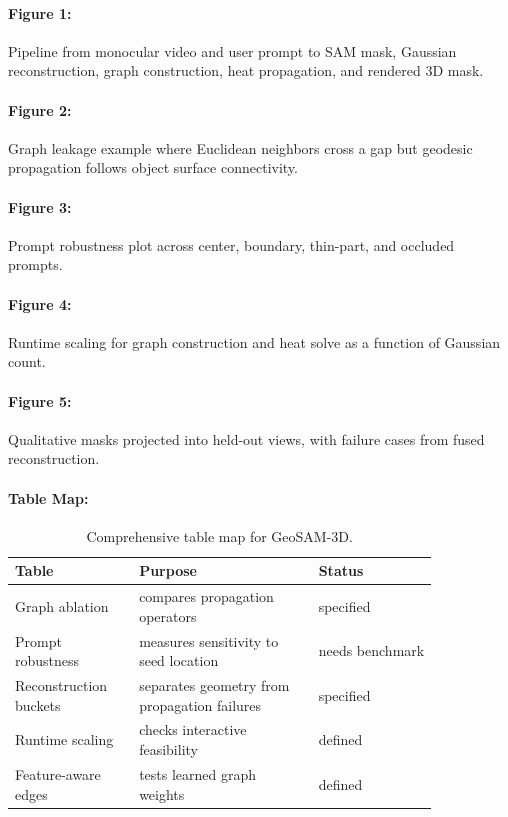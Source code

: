 \documentclass{article}
\begin{document}
\paragraph{Figure 1:}
Pipeline from monocular video and user prompt to SAM mask, Gaussian reconstruction, graph construction, heat propagation, and rendered 3D mask.

\paragraph{Figure 2:}
Graph leakage example where Euclidean neighbors cross a gap but geodesic propagation follows object surface connectivity.

\paragraph{Figure 3:}
Prompt robustness plot across center, boundary, thin-part, and occluded prompts.

\paragraph{Figure 4:}
Runtime scaling for graph construction and heat solve as a function of Gaussian count.

\paragraph{Figure 5:}
Qualitative masks projected into held-out views, with failure cases from fused reconstruction.

\paragraph{Table Map:}

\begin{table}[t]
\centering
\caption{Comprehensive table map for GeoSAM-3D.}
\begin{tabular}{@{}p{0.24\linewidth}p{0.36\linewidth}p{0.24\linewidth}@{}}
\toprule
\textbf{Table} & \textbf{Purpose} & \textbf{Status}\\
\midrule
Graph ablation & compares propagation operators & specified\\
Prompt robustness & measures sensitivity to seed location & needs benchmark\\
Reconstruction buckets & separates geometry from propagation failures & specified\\
Runtime scaling & checks interactive feasibility & defined\\
Feature-aware edges & tests learned graph weights & defined\\
\bottomrule
\end{tabular}
\end{table}
\end{document}

